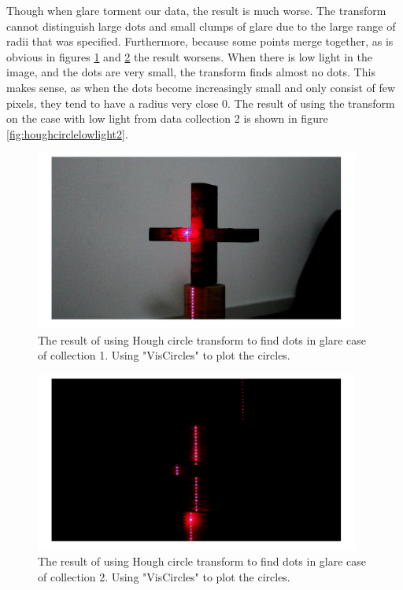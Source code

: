 Though when glare torment our data, the result is much worse. The transform cannot distinguish large dots and small clumps of glare  due to the large range of radii that was specified. Furthermore, because some points merge together, as is obvious in figures \ref{fig:houghcircleglare1} and \ref{fig:houghcircleglare2} the result worsens. When there is low light in the image, and the dots are very small, the transform finds almost no dots. This makes sense, as  when the dots become increasingly small and only consist of few pixels, they tend to have a radius  very close 0. The result of using the transform on the case with low light from data collection 2 is shown in figure \ref{fig:houghcirclelowlight2}.
\begin{figure}[H]
    \centering
    \includegraphics[width=0.95\textwidth]{figures/ImageAnalysis/HoughCircle/HoughCircles_glare1.png}
    \caption{The result of using Hough circle transform to find dots in glare case of collection 1. Using "VisCircles" to plot the circles.}
    \label{fig:houghcircleglare1}
\end{figure}
\begin{figure}[H]
    \centering
    \includegraphics[width=0.95\textwidth]{figures/ImageAnalysis/HoughCircle/HoughCircles_glare2.png}
    \caption{The result of using Hough circle transform to find dots in glare case of collection 2. Using "VisCircles" to plot the circles.}
    \label{fig:houghcircleglare2}
\end{figure}
